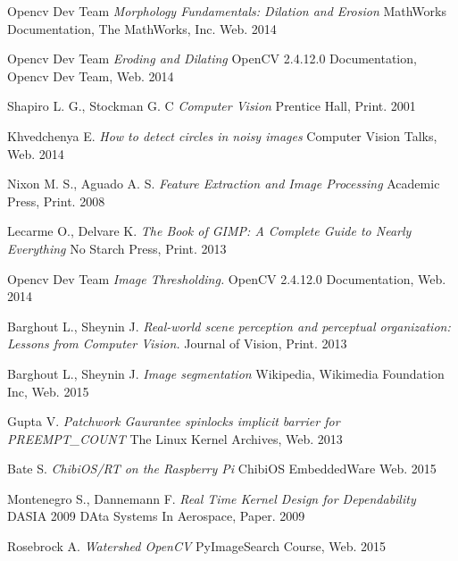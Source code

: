\documentclass[12pt,twoside,a4paper]{article}
\begin{document}
\begin{thebibliography}{9}
Opencv Dev Team
\textit{Morphology Fundamentals: Dilation and Erosion} MathWorks Documentation, The MathWorks, Inc. Web. 2014

Opencv Dev Team
\textit{Eroding and Dilating} OpenCV 2.4.12.0 Documentation, Opencv Dev Team, Web. 2014

Shapiro L. G., Stockman G. C
\textit{Computer Vision} Prentice Hall, Print. 2001

Khvedchenya E.
\textit{How to detect circles in noisy images} Computer Vision Talks, Web. 2014

Nixon M. S., Aguado A. S.
\textit{Feature Extraction and Image Processing} Academic Press, Print. 2008

Lecarme  O., Delvare K.
\textit{The Book of GIMP: A Complete Guide to Nearly Everything} No Starch Press, Print. 2013

Opencv Dev Team
\textit{Image Thresholding.} OpenCV 2.4.12.0 Documentation, Web. 2014

Barghout L., Sheynin J.
\textit{Real-world scene perception and perceptual organization: Lessons from Computer Vision.} Journal of Vision, Print. 2013

Barghout L., Sheynin J.
\textit{Image segmentation} Wikipedia, Wikimedia Foundation Inc, Web. 2015

Gupta V.
\textit{Patchwork Gaurantee spinlocks implicit barrier for PREEMPT\_COUNT} The Linux Kernel Archives, Web. 2013

Bate S.
\textit{ChibiOS/RT on the Raspberry Pi} ChibiOS EmbeddedWare Web. 2015

Montenegro S., Dannemann F. 
\textit{Real Time Kernel Design for Dependability} DASIA 2009 DAta Systems In Aerospace, Paper. 2009

Rosebrock A.
\textit{Watershed OpenCV} PyImageSearch Course, Web. 2015

\end{thebibliography}
\end{document}
